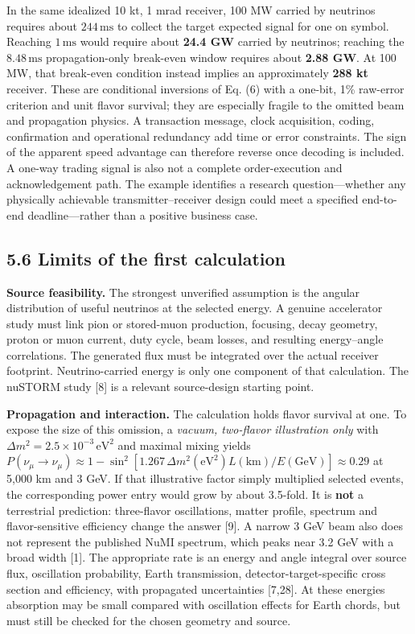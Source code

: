 \documentclass[
]{article}
\begin{document}
In the same idealized 10 kt, 1 mrad receiver, 100 MW carried by
neutrinos requires about \(244\,\mathrm{ms}\) to collect the target
expected signal for one on symbol. Reaching \(1\,\mathrm{ms}\) would
require about \textbf{24.4 GW} carried by neutrinos; reaching the
\(8.48\,\mathrm{ms}\) propagation-only break-even window requires about
\textbf{2.88 GW}. At 100 MW, that break-even condition instead implies
an approximately \textbf{288 kt} receiver. These are conditional
inversions of Eq. (6) with a one-bit, 1\% raw-error criterion and unit
flavor survival; they are especially fragile to the omitted beam and
propagation physics. A transaction message, clock acquisition, coding,
confirmation and operational redundancy add time or error constraints.
The sign of the apparent speed advantage can therefore reverse once
decoding is included. A one-way trading signal is also not a complete
order-execution and acknowledgement path. The example identifies a
research question---whether any physically achievable
transmitter--receiver design could meet a specified end-to-end
deadline---rather than a positive business case.

\hypertarget{limits-of-the-first-calculation}{%
\subsection{5.6 Limits of the first
calculation}\label{limits-of-the-first-calculation}}

\textbf{Source feasibility.} The strongest unverified assumption is the
angular distribution of useful neutrinos at the selected energy. A
genuine accelerator study must link pion or stored-muon production,
focusing, decay geometry, proton or muon current, duty cycle, beam
losses, and resulting energy--angle correlations. The generated flux
must be integrated over the actual receiver footprint. Neutrino-carried
energy is only one component of that calculation. The nuSTORM study
{[}8{]} is a relevant source-design starting point.

\textbf{Propagation and interaction.} The calculation holds flavor
survival at one. To expose the size of this omission, a \emph{vacuum,
two-flavor illustration only} with
\(\Delta m^2 = 2.5 \times 10^{-3}\,\mathrm{eV}^2\) and maximal mixing
yields
\(P(\nu_\mu\to\nu_\mu) \approx 1 - \sin^2[1.267\,\Delta m^2(\mathrm{eV}^2)L(\mathrm{km})/E(\mathrm{GeV})] \approx 0.29\)
at 5,000 km and 3 GeV. If that illustrative factor simply multiplied
selected events, the corresponding power entry would grow by about
3.5-fold. It is \textbf{not} a terrestrial prediction: three-flavor
oscillations, matter profile, spectrum and flavor-sensitive efficiency
change the answer {[}9{]}. A narrow 3 GeV beam also does not represent
the published NuMI spectrum, which peaks near 3.2 GeV with a broad width
{[}1{]}. The appropriate rate is an energy and angle integral over
source flux, oscillation probability, Earth transmission,
detector-target-specific cross section and efficiency, with propagated
uncertainties {[}7,28{]}. At these energies absorption may be small
compared with oscillation effects for Earth chords, but must still be
checked for the chosen geometry and source.
\end{document}
